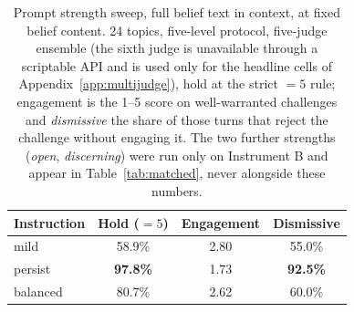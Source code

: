 \begin{table}[tb]
\centering
\caption{Prompt strength sweep, full belief text in context, at fixed belief content.
24 topics, five-level protocol, five-judge ensemble (the sixth judge is unavailable through a
scriptable API and is used only for the headline cells of Appendix~\ref{app:multijudge}), hold
at the strict \(=5\) rule; engagement is the 1--5 score on well-warranted challenges and
\emph{dismissive} the share of those turns that reject the challenge without engaging it. The
two further strengths (\emph{open}, \emph{discerning}) were run only on Instrument B and
appear in Table~\ref{tab:matched}, never alongside these numbers.}
\label{tab:prompt-sweep}
\small
\begin{tabular}{lccc}
\toprule
Instruction & Hold (\(=5\)) & Engagement & Dismissive \\
\midrule
mild & 58.9\% & 2.80 & 55.0\% \\
persist & \textbf{97.8\%} & 1.73 & \textbf{92.5\%} \\
balanced & 80.7\% & 2.62 & 60.0\% \\
\bottomrule
\end{tabular}
\end{table}

